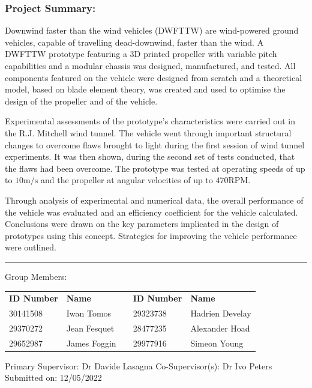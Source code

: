 \noindent \subsubsection*{Project Summary:}

Downwind faster than the wind vehicles (DWFTTW) are wind-powered ground vehicles, capable of travelling dead-downwind, faster than the wind. A DWFTTW prototype featuring a 3D printed propeller with variable pitch capabilities and a modular chassis was designed, manufactured, and tested. All components featured on the vehicle were designed from scratch and a theoretical model, based on blade element theory, was created and used to optimise the design of the propeller and of the vehicle.

Experimental assessments of the prototype's characteristics were carried out in the R.J. Mitchell wind tunnel. The vehicle went through important structural changes to overcome flaws brought to light during the first session of wind tunnel experiments. It was then shown, during the second set of tests conducted, that the flaws had been overcome. The prototype was tested at operating speeds of up to $10 \mathrm{m/s}$ and the propeller at angular velocities of up to $470 \mathrm{RPM}$. 

Through analysis of experimental and numerical data, the overall performance of the vehicle was evaluated and an efficiency coefficient for the vehicle calculated. Conclusions were drawn on the key parameters implicated in the design of prototypes using this concept. Strategies for improving the vehicle performance were outlined.


\vspace{1.7cm}

\hrule

\vspace{1.3cm}

\noindent Group Members:
\begin{table}[H]
\begin{tabular}{lllll}
\textbf{ID Number} & \textbf{Name} & \hspace{1cm} & \textbf{ID Number} & \textbf{Name}       \\
30141508           & Iwan Tomos           &                   & 29323738          & Hadrien Develay\\
29370272           & Jean Fesquet         &                   & 28477235          & Alexander Hoad \\
29652987           & James Foggin         &                   & 29977916          & Simeon Young 
\end{tabular}

\end{table}							
\noindent Primary Supervisor: Dr Davide Lasagna \hspace{2cm} Co-Supervisor(s): Dr Ivo Peters
\vspace{12pt}
\newline \noindent Submitted on: 12/05/2022





